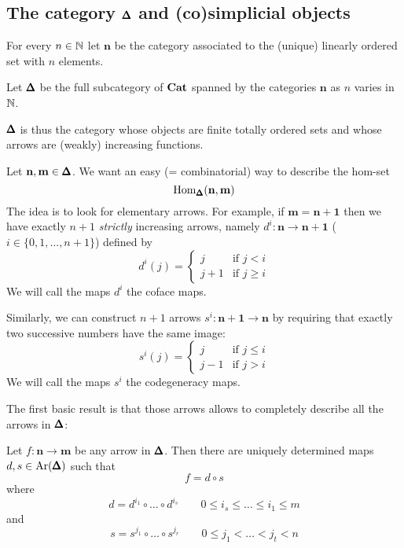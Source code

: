 \begin{refsection}
\section{The category \texorpdfstring{$\pmb{\Delta}$}{\textbackslash Delta} and (co)simplicial objects}

\begin{notation}
For every $n \in \mathbb{N}$ let $\mathbf n$ be the category associated to the (unique) linearly ordered set with $n$ elements.
\end{notation}

\begin{defin}
Let $\pmb{\Delta}$ be the full subcategory of $\mathbf{Cat}$ spanned by the categories $\mathbf n$ as $n$ varies in $\mathbb{N}$.
\end{defin}

\begin{rmk}
$\pmb{\Delta}$ is thus the category whose objects are finite totally ordered sets and whose arrows are (weakly) increasing functions.
\end{rmk}

Let $\mathbf n, \mathbf m \in \pmb{\Delta}$. We want an easy (= combinatorial) way to describe the hom-set
\[
\mathrm{Hom}_{\pmb{\Delta}}(\mathbf n, \mathbf m)
\]
The idea is to look for elementary arrows. For example, if $\mathbf m = \mathbf{n+1}$ then we have exactly $n+1$ \emph{strictly} increasing arrows, namely $d^i \colon \mathbf n \to \mathbf{n+1}$ ($i \in \{0,1,\ldots,n+1\}$) defined by
\[
d^i(j) = \begin{cases} j & \text{if } j < i \\ j + 1 & \text{if } j \ge i \end{cases}
\]
We will call the maps $d^i$ the coface maps.

Similarly, we can construct $n+1$ arrows $s^i \colon \mathbf{n+1} \to \mathbf n$ by requiring that exactly two successive numbers have the same image:
\[
s^i(j) = \begin{cases} j & \text{if } j \le i \\ j - 1 & \text{if } j > i \end{cases}
\]
We will call the maps $s^i$ the codegeneracy maps.

The first basic result is that those arrows allows to completely describe all the arrows in $\pmb{\Delta}$:

\begin{thm} \label{thm factorization epi-mono for Delta}
Let $f \colon \mathbf n \to \mathbf m$ be any arrow in $\pmb{\Delta}$. Then there are uniquely determined maps $d,s \in \mathrm{Ar}(\pmb{\Delta})$ such that
\[
f = d \circ s
\]
where
\begin{equation} \label{eq increasing part}
d = d^{i_1} \circ \ldots \circ d^{i_s} \qquad 0 \le i_s \le \ldots \le i_1 \le m
\end{equation}
and
\begin{equation} \label{eq decreasing part}
s = s^{j_1} \circ \ldots \circ s^{j_r} \qquad 0 \le j_1 < \ldots < j_t < n
\end{equation}
\end{thm}


\end{refsection}
